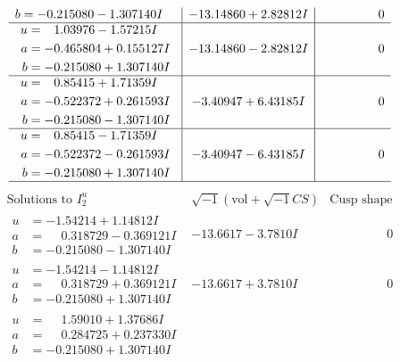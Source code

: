 \documentclass[1p]{elsarticle_modified}
\theoremstyle{definition}
\newcommand{\I}{\sqrt{-1}}
\begin{document}
$$\begin{array}{c|c|c}
\begin{aligned}
b &= -0.215080 - 1.307140 I\end{aligned}
 & -13.14860 + 2.82812 I & \phantom{-0.000000 } 0 \\ \hline\begin{aligned}
u &= \phantom{-}1.03976 - 1.57215 I \\
a &= -0.465804 + 0.155127 I \\
b &= -0.215080 + 1.307140 I\end{aligned}
 & -13.14860 - 2.82812 I & \phantom{-0.000000 } 0 \\ \hline\begin{aligned}
u &= \phantom{-}0.85415 + 1.71359 I \\
a &= -0.522372 + 0.261593 I \\
b &= -0.215080 - 1.307140 I\end{aligned}
 & -3.40947 + 6.43185 I & \phantom{-0.000000 } 0 \\ \hline\begin{aligned}
u &= \phantom{-}0.85415 - 1.71359 I \\
a &= -0.522372 - 0.261593 I \\
b &= -0.215080 + 1.307140 I\end{aligned}
 & -3.40947 - 6.43185 I & \phantom{-0.000000 } 0\\
 \hline 
 \end{array}$$\newpage$$\begin{array}{c|c|c}  
\text{Solutions to }I^u_{2}& \I (\text{vol} + \sqrt{-1}CS) & \text{Cusp shape}\\
 \hline 
\begin{aligned}
u &= -1.54214 + 1.14812 I \\
a &= \phantom{-}0.318729 - 0.369121 I \\
b &= -0.215080 - 1.307140 I\end{aligned}
 & -13.6617 - 3.7810 I & \phantom{-0.000000 } 0 \\ \hline\begin{aligned}
u &= -1.54214 - 1.14812 I \\
a &= \phantom{-}0.318729 + 0.369121 I \\
b &= -0.215080 + 1.307140 I\end{aligned}
 & -13.6617 + 3.7810 I & \phantom{-0.000000 } 0 \\ \hline\begin{aligned}
u &= \phantom{-}1.59010 + 1.37686 I \\
a &= \phantom{-}0.284725 + 0.237330 I \\
b &= -0.215080 + 1.307140 I\end{aligned}

\end{array}$$
\end{document}
